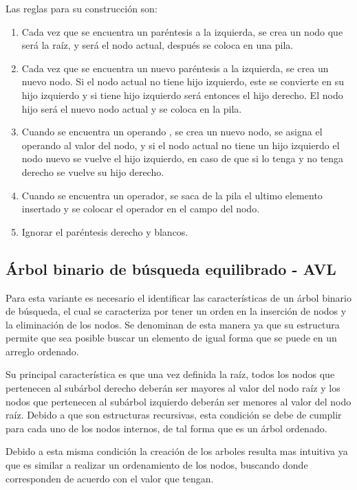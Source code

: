 \documentclass[12pt,a4paper]{article}
\begin{document}
	Las reglas para su construcción son:
	
\begin{enumerate}
\item Cada vez que se encuentra un paréntesis a la izquierda, se crea 	  un nodo que será la raíz, y será el nodo actual, después se 			  coloca en una pila. 
\item Cada vez que se encuentra un nuevo paréntesis a la izquierda, 		  se crea un nuevo nodo. Si el nodo actual no tiene hijo 				  izquierdo, este se convierte en su hijo izquierdo y si tiene 			  hijo izquierdo será entonces el hijo derecho. El nodo hijo será 	  el nuevo nodo actual y se coloca en la pila.
\item Cuando se encuentra un operando , se crea un nuevo nodo, se 			  asigna el operando al valor del nodo, y si el nodo actual no 			  tiene un hijo izquierdo el nodo nuevo se vuelve el hijo 				  izquierdo, en caso de que si lo tenga y no tenga derecho se 			  vuelve su hijo derecho.
\item Cuando se encuentra un operador, se saca de la pila el ultimo 		  elemento insertado y se colocar el operador en el campo del 			  nodo.
\item Ignorar el paréntesis derecho y blancos.
\end{enumerate}

		\subsection{Árbol binario de búsqueda equilibrado - AVL}
	Para esta variante es necesario el identificar las características de un árbol binario de búsqueda, el cual se caracteriza por tener un orden en la inserción de nodos y la eliminación de los nodos. Se denominan de esta manera ya que su estructura permite que sea posible buscar un elemento de igual forma que se puede en un arreglo ordenado.
	
	Su principal característica es que una vez definida la raíz, todos los nodos que pertenecen al subárbol derecho deberán ser mayores al valor del nodo raíz y los nodos que pertenecen al subárbol izquierdo deberán ser menores al valor del nodo raíz.
Debido a que son estructuras recursivas, esta condición se debe de cumplir para cada uno de los nodos internos, de tal forma que es un árbol ordenado. 

	Debido a esta misma condición la creación de los arboles resulta mas intuitiva ya que es similar a realizar un ordenamiento de los nodos, buscando donde corresponden de acuerdo con el valor que tengan.
\end{document}
